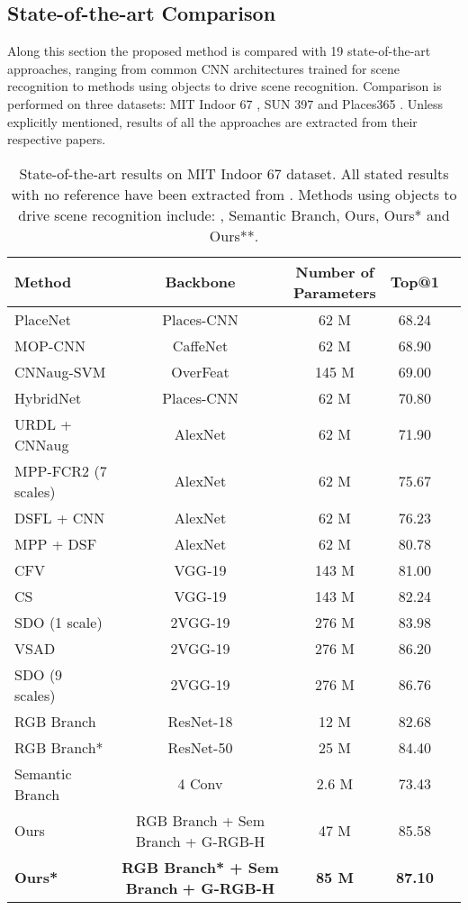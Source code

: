 \documentclass[review, 3p, sort&compress]{elsarticle}
\begin{document}
\subsection{State-of-the-art Comparison}
Along this section the proposed method is compared with 19 state-of-the-art approaches, ranging from common CNN architectures trained for scene recognition to methods using objects to drive scene recognition. Comparison is performed on three datasets: MIT Indoor 67 \cite{quattoni2009recognizing}, SUN 397 \cite{xiao2010sun} and Places365 \cite{zhou2018places}. Unless explicitly mentioned, results of all the approaches are extracted from their respective papers.

\begin{table}[t!]
    \begin{centering}
    \renewcommand{\arraystretch}{1.2}
    \footnotesize
    \begin{tabular}{lcccc}
        \hline 
        Method & Backbone & \makecell{Number of \\ Parameters} & Top@1\tabularnewline
        \hline 
        PlaceNet & Places-CNN &  62 M & 68.24 \tabularnewline
        MOP-CNN & CaffeNet &  62 M & 68.90\tabularnewline
        CNNaug-SVM & OverFeat &  145 M & 69.00\tabularnewline
        HybridNet & Places-CNN &  62 M & 70.80\tabularnewline
        URDL + CNNaug & AlexNet &  62 M & 71.90\tabularnewline
        MPP-FCR2 (7 scales) & AlexNet &  62 M & 75.67\tabularnewline
        DSFL + CNN & AlexNet &  62 M & 76.23\tabularnewline
        MPP + DSF  & AlexNet &  62 M & 80.78\tabularnewline
        CFV & VGG-19 &  143 M & 81.00\tabularnewline
        CS & VGG-19 &  143 M & 82.24\tabularnewline
        SDO (1 scale) \cite{cheng2018scene} & 2VGG-19 &  276 M & 83.98\tabularnewline
        VSAD \cite{wang2017weakly} & 2VGG-19 &  276 M & 86.20\tabularnewline
        SDO (9 scales) \cite{cheng2018scene} & 2VGG-19 &  276 M & 86.76\tabularnewline
        \hline
        RGB Branch & ResNet-18 &  12 M & 82.68\tabularnewline
        RGB Branch* & ResNet-50 &  25 M & 84.40\tabularnewline
        Semantic Branch & 4 Conv &  2.6 M & 73.43\tabularnewline
        Ours & RGB Branch + Sem Branch + G-RGB-H &  47 M & 85.58\tabularnewline
        \textbf{Ours*} & \textbf{RGB Branch* + Sem Branch} \textbf{+ G-RGB-H} & \textbf{ 85 M} & \textbf{87.10}\tabularnewline
        \hline 
    \end{tabular}
    \caption{State-of-the-art results on MIT Indoor 67 dataset. All stated results with no reference have been extracted from \cite{cheng2018scene}. Methods using objects to drive scene recognition include: \cite{jiang2019deep, cheng2018scene, wang2017weakly}, Semantic Branch, Ours, Ours* and Ours**.}
    \label{tab:MIT Indoor 67 Results}
    \par\end{centering}
\end{table}
\end{document}

